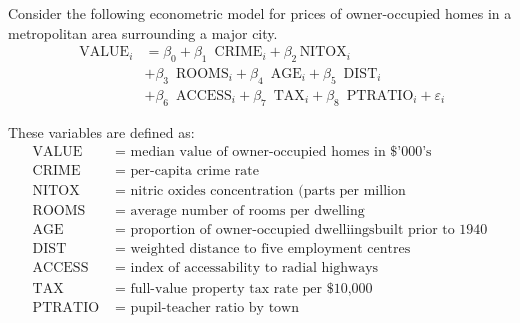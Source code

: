 \documentclass[12pt,a4paper]{article}
\begin{document}
Consider the following econometric model for prices of owner-occupied homes in a metropolitan area surrounding a major city.
\begin{align*}
\mbox{ VALUE}_{i} & = \beta_{0} + \beta_{1}\,\mbox{ CRIME}_{i} +
\beta_{2}\,\mbox{
NITOX}_{i} \\
 &+ \beta_{3}\,\mbox{ ROOMS}_{i} + \beta_{4}\,\mbox{ AGE}_{i} + \beta_{5}\,\mbox{ DIST}_{i}
 \\
 & + \beta_{6}\,\mbox{ ACCESS}_{i} + \beta_{7}\,\mbox{ TAX}_{i}
+ \beta_{8}\,\mbox{ PTRATIO}_{i} + \varepsilon_{i}
\end{align*}

These variables are defined as:
\begin{align*}
\mbox{ VALUE } & = \mbox{ median value of owner-occupied homes in \$'000's }\\
\mbox{ CRIME } & = \mbox{ per-capita crime rate }\\
\mbox{ NITOX } & = \mbox{ nitric oxides concentration (parts per million }\\
\mbox{ ROOMS } & = \mbox{ average number of rooms per dwelling }\\
\mbox{ AGE } & = \mbox{ proportion of owner-occupied dwelliingsbuilt prior to 1940 }\\
\mbox{ DIST } & = \mbox{ weighted distance to five employment centres }\\
\mbox{ ACCESS }& = \mbox{ index of accessability to radial highways } \\
\mbox{ TAX } & = \mbox{ full-value property tax rate per \$10,000 }\\
\mbox{ PTRATIO } & = \mbox{ pupil-teacher ratio by town  }\\
\end{align*}
\end{document}
